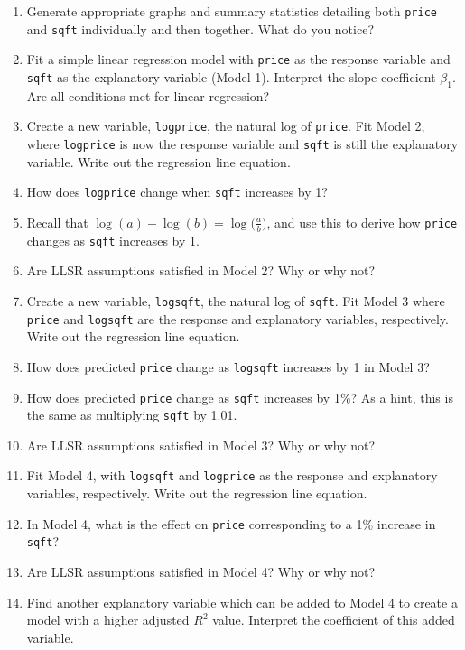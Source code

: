 \documentclass[
]{krantz}
\providecommand{\tightlist}{%
  \setlength{\itemsep}{0pt}\setlength{\parskip}{0pt}}
\begin{document}
\begin{enumerate}
  \begin{enumerate}
  \def\labelenumii{\alph{enumii}.}
  \tightlist
  \item
    Generate appropriate graphs and summary statistics detailing both \texttt{price} and \texttt{sqft} individually and then together. What do you notice?
  \item
    Fit a simple linear regression model with \texttt{price} as the response variable and \texttt{sqft} as the explanatory variable (Model 1). Interpret the slope coefficient \(\beta_1\). Are all conditions met for linear regression?
  \item
    Create a new variable, \texttt{logprice}, the natural log of \texttt{price}. Fit Model 2, where \texttt{logprice} is now the response variable and \texttt{sqft} is still the explanatory variable. Write out the regression line equation.
  \item
    How does \texttt{logprice} change when \texttt{sqft} increases by 1?
  \item
    Recall that \(\log(a) - \log(b) = \log\big(\frac{a}{b}\big)\), and use this to derive how \texttt{price} changes as \texttt{sqft} increases by 1.
  \item
    Are LLSR assumptions satisfied in Model 2? Why or why not?
  \item
    Create a new variable, \texttt{logsqft}, the natural log of \texttt{sqft}. Fit Model 3 where \texttt{price} and \texttt{logsqft} are the response and explanatory variables, respectively. Write out the regression line equation.
  \item
    How does predicted \texttt{price} change as \texttt{logsqft} increases by 1 in Model 3?
  \item
    How does predicted \texttt{price} change as \texttt{sqft} increases by 1\%? As a hint, this is the same as multiplying \texttt{sqft} by 1.01.
  \item
    Are LLSR assumptions satisfied in Model 3? Why or why not?
  \item
    Fit Model 4, with \texttt{logsqft} and \texttt{logprice} as the response and explanatory variables, respectively. Write out the regression line equation.
  \item
    In Model 4, what is the effect on \texttt{price} corresponding to a 1\% increase in \texttt{sqft}?
  \item
    Are LLSR assumptions satisfied in Model 4? Why or why not?
  \item
    Find another explanatory variable which can be added to Model 4 to create a model with a higher adjusted \(R^2\) value. Interpret the coefficient of this added variable.
  \end{enumerate}
\end{enumerate}
\end{document}

